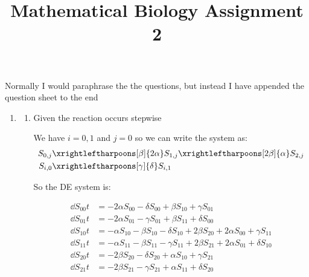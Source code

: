 \documentclass{X:/Documents/Coding/Latex/myassignment}
\title{Mathematical Biology Assignment 2}
\begin{document}
\maketitle
Normally I would paraphrase the  the questions, but instead I have appended the question sheet to the end
\begin{enumerate}

	\item 
	\begin{enumerate}
		\item Given the reaction occurs stepwise

		We have $i=0,1$ and $j=0$ so we can write the system as:
		\begin{align*}
			S_{0,j} &\xrightleftharpoons[\beta]{2\alpha} S_{1,j} \xrightleftharpoons[2\beta]{\alpha} S_{2,j}\\
			S_{i,0} &\xrightleftharpoons[\gamma]{\delta} S_{i,1}
		\end{align*}

		So the DE system is:

		\begin{align*}
			\dd{S_{00}}{t} &= - 2 \alpha S_{00} -\delta S_{00} + \beta S_{10} + \gamma S_{01} \\
			\dd{S_{01}}{t} &= - 2 \alpha S_{01} - \gamma S_{01} +\beta S_{11} + \delta S_{00} \\
			\dd{S_{10}}{t} &= - \alpha S_{10} -\beta S_{10} - \delta S_{10} + 2 \beta S_{20} + 2\alpha S_{00} +  \gamma S_{11}\\
			\dd{S_{11}}{t} &= - \alpha S_{11} -\beta S_{11} - \gamma S_{11} + 2 \beta S_{21} + 2\alpha S_{01} +  \delta S_{10}\\
			\dd{S_{20}}{t} &= - 2\beta S_{20} - \delta S_{20} + \alpha S_{10} + \gamma S_{21} \\
			\dd{S_{21}}{t} &= - 2\beta S_{21} - \gamma S_{21} + \alpha S_{11} + \delta S_{20} \\
		\end{align*}



\end{enumerate}
\end{enumerate}
\end{document}
